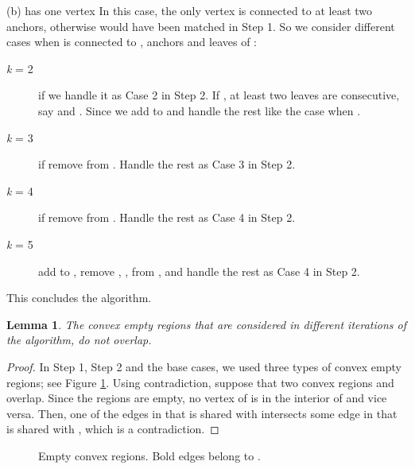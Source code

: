 \documentclass[11pt,a4paper]{article}
\newtheorem{lemma}{Lemma}
\begin{document}
\begin{paragraph}{(b)  has one vertex}
In this case, the only vertex  is connected to at least two anchors, otherwise  would have been matched in Step 1. So we consider different cases when  is connected to ,  anchors and  leaves of :
\begin{description}
 \item[{\em k} = 2] if  we handle it as Case 2 in Step 2. If , at least two leaves are consecutive, say  and . Since  we add  to  and handle the rest like the case when . 
\item[{\em k} = 3] if  remove  from . Handle the rest as Case 3 in Step 2.
\item[{\em k} = 4] if  remove  from . Handle the rest as Case 4 in Step 2. 
\item[{\em k} = 5] add  to , remove , ,  from , and handle the rest as Case 4 in Step 2.
\end{description}
\end{paragraph}

This concludes the algorithm.

\begin{lemma}
\label{convex-disjoint-lemma}
The convex empty regions that are considered in different iterations of the algorithm, do not overlap.
\end{lemma}
\begin{proof}
In Step 1, Step 2 and the base cases, we used three types of convex empty regions; see Figure \ref{convex-disjoint-fig}.
Using contradiction, suppose that two convex regions  and  overlap. Since the regions are empty, no vertex of  is in the interior of  and vice versa. Then, one of the edges in  that is shared with  intersects some edge in  that is shared with , which is a contradiction.   
\end{proof}

\begin{figure}[ht]
  \centering
\setlength{\tabcolsep}{0in}
  
  \caption{Empty convex regions. Bold edges belong to .}
\label{convex-disjoint-fig}
\end{figure}
\end{document}

